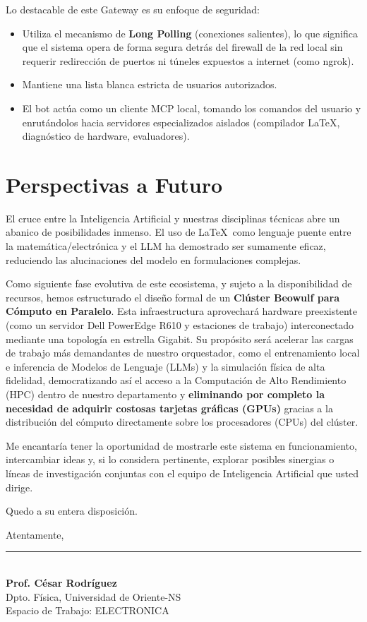 \documentclass[12pt,letterpaper]{article}
\begin{document}
Lo destacable de este Gateway es su enfoque de seguridad:
\begin{itemize}
    \item Utiliza el mecanismo de \textbf{Long Polling} (conexiones salientes), lo que significa que el sistema opera de forma segura detrás del firewall de la red local sin requerir redirección de puertos ni túneles expuestos a internet (como ngrok).
    \item Mantiene una lista blanca estricta de usuarios autorizados.
    \item El bot actúa como un cliente MCP local, tomando los comandos del usuario y enrutándolos hacia servidores especializados aislados (compilador LaTeX, diagnóstico de hardware, evaluadores).
\end{itemize}

\section{Perspectivas a Futuro}

El cruce entre la Inteligencia Artificial y nuestras disciplinas técnicas abre un abanico de posibilidades inmenso. El uso de \LaTeX\ como lenguaje puente entre la matemática/electrónica y el LLM ha demostrado ser sumamente eficaz, reduciendo las alucinaciones del modelo en formulaciones complejas.

Como siguiente fase evolutiva de este ecosistema, y sujeto a la disponibilidad de recursos, hemos estructurado el diseño formal de un \textbf{Clúster Beowulf para Cómputo en Paralelo}. Esta infraestructura aprovechará hardware preexistente (como un servidor Dell PowerEdge R610 y estaciones de trabajo) interconectado mediante una topología en estrella Gigabit. Su propósito será acelerar las cargas de trabajo más demandantes de nuestro orquestador, como el entrenamiento local e inferencia de Modelos de Lenguaje (LLMs) y la simulación física de alta fidelidad, democratizando así el acceso a la Computación de Alto Rendimiento (HPC) dentro de nuestro departamento y \textbf{eliminando por completo la necesidad de adquirir costosas tarjetas gráficas (GPUs)} gracias a la distribución del cómputo directamente sobre los procesadores (CPUs) del clúster.

Me encantaría tener la oportunidad de mostrarle este sistema en funcionamiento, intercambiar ideas y, si lo considera pertinente, explorar posibles sinergias o líneas de investigación conjuntas con el equipo de Inteligencia Artificial que usted dirige.

Quedo a su entera disposición.

\vspace{1cm}
Atentamente,

\vspace{1.5cm}
\noindent\rule{6cm}{0.4pt}\\
\textbf{Prof. César Rodríguez}\\
Dpto. Física, Universidad de Oriente-NS\\
Espacio de Trabajo: ELECTRONICA
\end{document}
